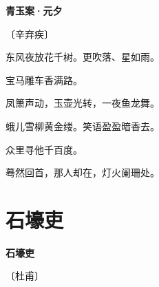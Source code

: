 \documentclass[12pt,UTF-8,openany,fontset=none]{ctexbook}
\begin{document}
\begin{center}
    {\bfseries 青玉案·元夕}

    \vspace{18pt}

    \begin{large}\xuwen
        〔辛弃疾〕
    \end{large}

\end{center}

    \vspace{18pt}  %

\begin{center}
    \begin{Large}

        东风夜放花千树。更吹落、星如雨。

        宝马雕车香满路。

        凤箫声动，玉壶光转，一夜鱼龙舞。

        \vspace{18pt}  %

        蛾儿雪柳黄金缕。笑语盈盈暗香去。

        众里寻他千百度。

        蓦然回首，那人却在，灯火阑珊处。

    \end{Large}

\end{center}

\vspace{8pt}
\clearpage

\section{石壕吏}


\begin{center}
    {\bfseries 石壕吏}

    \vspace{18pt}

    \begin{large}\xuwen
        〔杜甫〕
    \end{large}

\end{center}

    \vspace{18pt}  %
\end{document}
